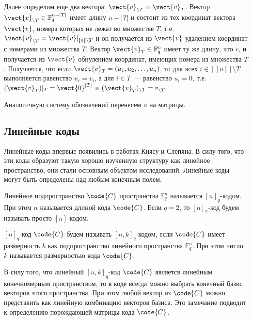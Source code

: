\documentclass[12pt]{extarticle}
\begin{document}
Далее определим еще два вектора: \(\vect{v}_{\setminus T}\) и \(\vect{v}_{T}\).
Вектор \(\vect{v}_{\setminus T}\in \mathbb{F}_{q}^{n-|T|}\) имеет длину \(n-|T|\) и состоит из тех координат вектора \(\vect{v}\), номера которых не лежат во множестве \(T\), т.е. \(\vect{v}_{\setminus T}=\vect{v}\vert_{[\![n]\!]\setminus T}\) и он получается из \(\vect{v}\) удалением координат с номерами из множества \(T\).
Вектор \(\vect{v}_{T}\in\mathbb{F}_{q}^{n}\) имеет ту же длину, что \(v\), и получается из \(\vect{v}\) обнулением координат, имеющих номера из множества \(T\).
Получается, что если \(\vect{v}_{T}= \left(u_{1}, u_{2}, \dotsc, u_{n}\right)\), то для всех \(i\in [\![n]\!]\setminus T\) выполняется равенство \(u_{i}=v_{i}\), а для \(i\in T\)~--- равенство \(u_{i}=0\), т.е. \((\vect{v}_{T})\vert_{T}=\vect{0}^{|T|}\) и \((\vect{v}_{T})_{\setminus T}=v_{\setminus T}\).

Аналогичную систему обозначений перенесем и на матрицы.
\subsection{Линейные коды}
\label{sec:orga51ba09}
Линейные коды впервые появились в работах Киясу и Слепяна.
В силу того, что эти коды образуют такую хорошо изученную структуру как линейное пространство, они стали основным объектом исследований.
Линейные коды могут быть определены над любым конечным полем.

\begin{definition}\label{def:ncode}
Линейное подпространство \(\code{C}\) пространства \(\mathbb{F}^n_q\) называется \([n]_q\)-кодом.
При этом \(n\) называется длиной кода \(\code{C}\).
Если \(q=2\), то \([n]_2\)-код будем называть просто \([n]\)-кодом.
\end{definition}

\begin{definition}\label{def:nkcode}
\([n]_q\)-код \(\code{C}\) будем называть \([n,k]_q\)-кодом, если \(\code{C}\) имеет размерность \(k\) как подпространство линейного пространства \(\mathbb{F}^n_q\).
При этом число \(k\) называется размерностью кода \(\code{C}\).
\end{definition}

В силу того, что линейный \([n,k]_q\)-код \(\code{C}\) является линейным конечномерным пространством, то в коде всегда можно выбрать конечный базис векторов этого пространства.
При этом любой вектор из \(\code{C}\) можно представить как линейную комбинацию векторов базиса.
Это замечание подводит к определению порождающей матрицы кода \(\code{C}\).
\end{document}
